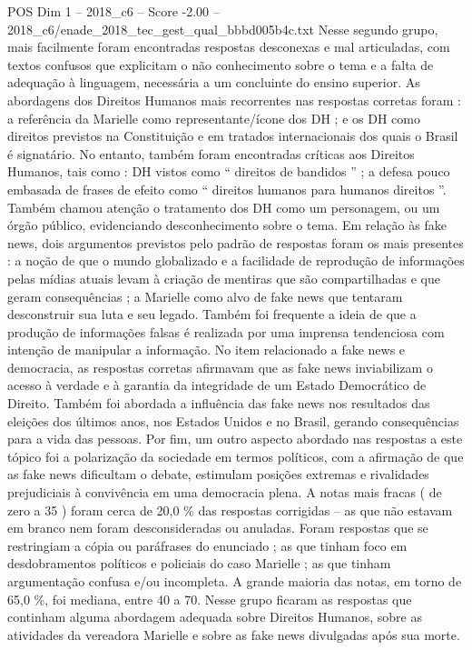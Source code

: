 \begin{textsample}{POS Dim 1 – 2018\_c6 – Score -2.00 – 2018\_c6/enade\_2018\_tec\_gest\_qual\_bbbd005b4c.txt}
Nesse segundo grupo, mais facilmente foram encontradas respostas desconexas e mal articuladas, com textos confusos que explicitam o não conhecimento sobre o tema e a falta de adequação à linguagem, necessária a um concluinte do ensino superior.
As abordagens dos Direitos Humanos mais recorrentes nas respostas corretas foram : a referência da Marielle como representante/ícone dos DH ; e os DH como direitos previstos na Constituição e em tratados internacionais dos quais o Brasil é signatário.
No entanto, também foram encontradas críticas aos Direitos Humanos, tais como : DH vistos como “ direitos de bandidos ” ; a defesa pouco embasada de frases de efeito como “ direitos humanos para humanos direitos ”.
Também chamou atenção o tratamento dos DH como um personagem, ou um órgão público, evidenciando desconhecimento sobre o tema.
Em relação às fake news, dois argumentos previstos pelo padrão de respostas foram os mais presentes : a noção de que o mundo globalizado e a facilidade de reprodução de informações pelas mídias atuais levam à criação de mentiras que são compartilhadas e que geram consequências ; a Marielle como alvo de fake news que tentaram desconstruir sua luta e seu legado.
Também foi frequente a ideia de que a produção de informações falsas é realizada por uma imprensa tendenciosa com intenção de manipular a informação.
No item relacionado a fake news e democracia, as respostas corretas afirmavam que as fake news inviabilizam o acesso à verdade e à garantia da integridade de um Estado Democrático de Direito.
Também foi abordada a influência das fake news nos resultados das eleições dos últimos anos, nos Estados Unidos e no Brasil, gerando consequências para a vida das pessoas.
Por fim, um outro aspecto abordado nas respostas a este tópico foi a polarização da sociedade em termos políticos, com a afirmação de que as fake news dificultam o debate, estimulam posições extremas e rivalidades prejudiciais à convivência em uma democracia plena.
A notas mais fracas ( de zero a 35 ) foram cerca de 20,0 \% das respostas corrigidas – as que não estavam em branco nem foram desconsideradas ou anuladas.
Foram respostas que se restringiam a cópia ou paráfrases do enunciado ; as que tinham foco em desdobramentos políticos e policiais do caso Marielle ; as que tinham argumentação confusa e/ou incompleta.
A grande maioria das notas, em torno de 65,0 \%, foi mediana, entre 40 a 70.
Nesse grupo ficaram as respostas que continham alguma abordagem adequada sobre Direitos Humanos, sobre as atividades da vereadora Marielle e sobre as fake news divulgadas após sua morte.

\end{textsample}
